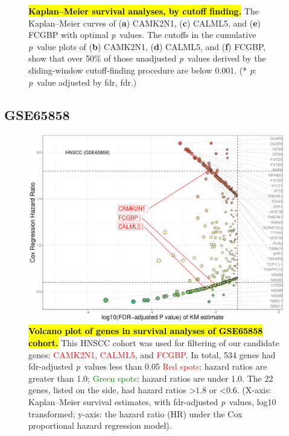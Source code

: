 \documentclass[
paper=landscape,
paper=160mm:90mm, %
fontsize=11pt, %
pagesize, %
parskip=half-, %
]{scrartcl} %
\newcommand{\bcaption}[2]{\caption{\textbf{#1} #2}}
\theoremstyle{mythmstyle} %
\begin{document}
\begin{figure}[H]
\bcaption{\hl{Kaplan--Meier survival analyses, by cutoff finding.}}
{The Kaplan--Meier curves of (\textbf{a}) CAMK2N1, (\textbf{c}) CALML5, and (\textbf{e}) FCGBP with optimal \textit{p}~values. 
The cutoffs in the cumulative \textit{p}~value plots of (\textbf{b}) CAMK2N1, (\textbf{d}) CALML5, and (\textbf{f}) FCGBP,
show that over 50\% of those unadjusted \textit{p}~values derived by the sliding-window cutoff-finding procedure are below 0.001.
(* \textit{p}: \textit{p}~value adjusted by \acrlong{fdr}, \acrshort{fdr}.)
}
\label{fig:figure4}
\end{figure}



\subsection{GSE65858}

\begin{figure}[H]
    \includegraphics[width=13cm]{Rplot_GSE65858_CoxHR_CAMK2N1_top3FDRKM.pdf}
    \bcaption{\hl{Volcano plot of genes in survival analyses of GSE65858 cohort.}}{
    This HNSCC cohort was used for filtering of our candidate genes: \textcolor{red}{CAMK2N1}, \textcolor{red}{CALML5}, and \textcolor{red}{FCGBP}.
    In total, 534 genes had \acrshort{fdr}-adjusted \textit{p}~values less than 0.05
    \textcolor{red}{Red spots}: hazard ratios are greater than 1.0;
    \textcolor{green}{Green spots}: hazard ratios are under 1.0.
    The 22 genes, listed on the side, had hazard ratios >$1.8$ or <$0.6$.
    (X-axis: Kaplan--Meier survival estimates, with \acrshort{fdr}-adjusted \textit{p}~values, log10 transformed; y-axis: the hazard ratio (HR) under the Cox proportional hazard regression model).
    }
    \label{fig:hazards534}
\end{figure}
\end{document}
